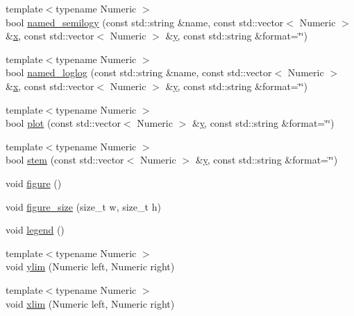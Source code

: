 \begin{DoxyCompactItemize}
{\footnotesize template$<$typename Numeric $>$ }\\bool \mbox{\hyperlink{namespacematplotlibcpp_a34ff51e2a6f94ea30b4ead714f480c4f}{named\+\_\+semilogy}} (const std\+::string \&name, const std\+::vector$<$ Numeric $>$ \&\mbox{\hyperlink{plottingTest_8cpp_aa0155849a1850c1edcfe7bce685b08f1}{x}}, const std\+::vector$<$ Numeric $>$ \&\mbox{\hyperlink{plottingTest_8cpp_a64d0474b77956c0e971da1b6cb1ddacd}{y}}, const std\+::string \&format=\char`\"{}\char`\"{})
\item 
{\footnotesize template$<$typename Numeric $>$ }\\bool \mbox{\hyperlink{namespacematplotlibcpp_ad7616968e5a639737fd547eb7fa0a8a0}{named\+\_\+loglog}} (const std\+::string \&name, const std\+::vector$<$ Numeric $>$ \&\mbox{\hyperlink{plottingTest_8cpp_aa0155849a1850c1edcfe7bce685b08f1}{x}}, const std\+::vector$<$ Numeric $>$ \&\mbox{\hyperlink{plottingTest_8cpp_a64d0474b77956c0e971da1b6cb1ddacd}{y}}, const std\+::string \&format=\char`\"{}\char`\"{})
\item 
{\footnotesize template$<$typename Numeric $>$ }\\bool \mbox{\hyperlink{namespacematplotlibcpp_a92c59dd37fb3f355514d88e364ddfde9}{plot}} (const std\+::vector$<$ Numeric $>$ \&\mbox{\hyperlink{plottingTest_8cpp_a64d0474b77956c0e971da1b6cb1ddacd}{y}}, const std\+::string \&format=\char`\"{}\char`\"{})
\item 
{\footnotesize template$<$typename Numeric $>$ }\\bool \mbox{\hyperlink{namespacematplotlibcpp_a40ac4e0d416fad21899637dcf8d281c6}{stem}} (const std\+::vector$<$ Numeric $>$ \&\mbox{\hyperlink{plottingTest_8cpp_a64d0474b77956c0e971da1b6cb1ddacd}{y}}, const std\+::string \&format=\char`\"{}\char`\"{})
\item 
void \mbox{\hyperlink{namespacematplotlibcpp_ade0e4c19cb3e1c9e4919f67da97bb992}{figure}} ()
\item 
void \mbox{\hyperlink{namespacematplotlibcpp_a91e91bcdcfc7632a917830bfe3f71ca3}{figure\+\_\+size}} (size\+\_\+t w, size\+\_\+t h)
\item 
void \mbox{\hyperlink{namespacematplotlibcpp_a916bb5a9dc5f6a24877cc027bf4ee624}{legend}} ()
\item 
{\footnotesize template$<$typename Numeric $>$ }\\void \mbox{\hyperlink{namespacematplotlibcpp_a4645651772918e2dad7d36d9eeaeaefa}{ylim}} (Numeric left, Numeric right)
\item 
{\footnotesize template$<$typename Numeric $>$ }\\void \mbox{\hyperlink{namespacematplotlibcpp_a712cd34472b3687668048899bee4cdbf}{xlim}} (Numeric left, Numeric right)

\end{DoxyCompactItemize}
